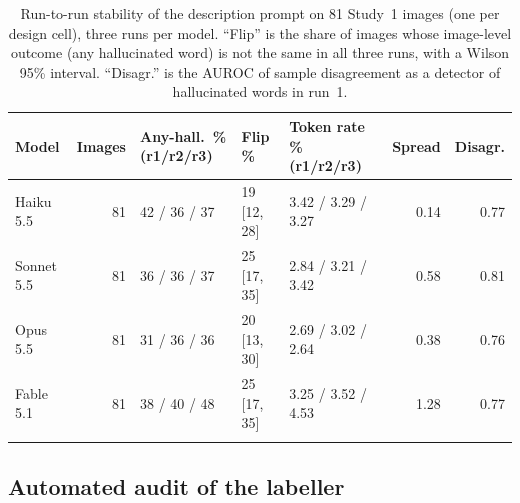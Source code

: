 \documentclass[pdflatex,sn-mathphys-num]{sn-jnl}%
\theoremstyle{thmstyleone}%
\theoremstyle{thmstyletwo}%
\theoremstyle{thmstylethree}%
\newcommand{\StabN}{81}
\begin{document}
\begin{table}[!tbp]
\caption{Run-to-run stability of the description prompt on \StabN{} Study~1 images (one per design cell), three runs per model. ``Flip'' is the share of images whose image-level outcome (any hallucinated word) is not the same in all three runs, with a Wilson 95\% interval. ``Disagr.'' is the AUROC of sample disagreement as a detector of hallucinated words in run~1.}\label{tab:stab}
\footnotesize
\begin{tabular*}{\textwidth}{@{\extracolsep\fill}lrlllrr}
\toprule
Model & Images & Any-hall.\ \% (r1/r2/r3) & Flip \% & Token rate \% (r1/r2/r3) & Spread & Disagr. \\
\midrule
Haiku 5.5 & 81 & 42 / 36 / 37 & 19 [12, 28] & 3.42 / 3.29 / 3.27 & 0.14 & 0.77 \\
Sonnet 5.5 & 81 & 36 / 36 / 37 & 25 [17, 35] & 2.84 / 3.21 / 3.42 & 0.58 & 0.81 \\
Opus 5.5 & 81 & 31 / 36 / 36 & 20 [13, 30] & 2.69 / 3.02 / 2.64 & 0.38 & 0.76 \\
Fable 5.1 & 81 & 38 / 40 / 48 & 25 [17, 35] & 3.25 / 3.52 / 4.53 & 1.28 & 0.77 \\
\botrule
\end{tabular*}
\end{table}

\subsection{Automated audit of the labeller}\label{sec:audit_res}
\end{document}
